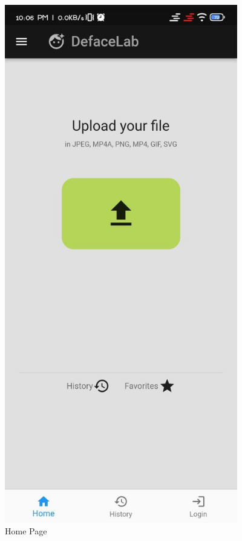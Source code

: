 \begin{figure}[ht]
    \centering
    \includegraphics[width= 4in,height =8 in ]{img/homepage.jpg}
    \caption{Home Page}
\end{figure}

